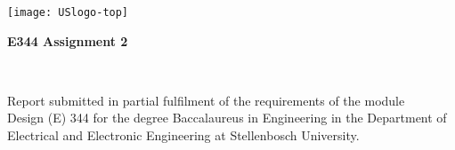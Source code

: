 \graphicspath{{frontmatter/fig/}}

\begin{titlepage}
\begin{center}

\texttt{[image: USlogo-top]}

\vfill

{\sffamily \bfseries \huge E344 Assignment 2 \par}

\vfill

{\large {\Large \nameFull} \\ \stNumber \par}

\vfill

\vfill

{Report submitted in partial fulfilment of the requirements of the module \\
Design (E) 344 for the degree Baccalaureus in Engineering in the Department of
Electrical and Electronic Engineering at Stellenbosch University. \par}

\vfill


\vfill

{\Large \myDate}
\end{center}
\end{titlepage}
